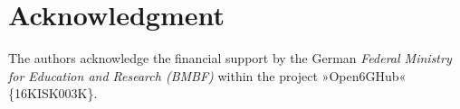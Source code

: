 \documentclass[%
	final,%
	conference,%
    comsoc,%
	letterpaper,%
	oneside,%
	twocolumn,%
	nofonttune,%
]{IEEEtran}%
\newcommand{\nl}{\par\noindent}%
\newcommand{\npi}{\par\vspace{\baselineskip}\noindent}%
\begin{document}
\section*{Acknowledgment}%
The authors acknowledge the financial support by the German \textit{Federal Ministry for Education and Research (BMBF)} within the project »Open6GHub« \{16KISK003K\}.
%
%
%
%
%
%
%
%
%
%
\clearpage%
%
%
%
\TempDisplayPreparation%
%
%
%
%
%
% 
\end{document}
